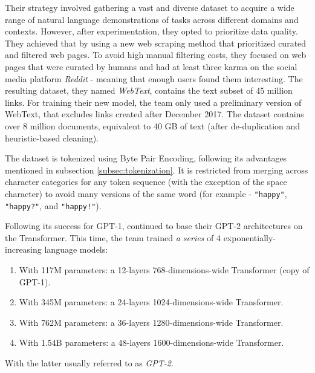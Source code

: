 \documentclass{article}
\begin{document}
\medskip
\noindent
Their strategy involved gathering a vast and diverse dataset to acquire a wide range of natural language demonstrations of tasks across different domains and contexts. However, after experimentation, they opted to prioritize data quality. They achieved that by using a new web scraping method that prioritized curated and filtered web pages. To avoid high manual filtering costs, they focused on web pages that were curated by humans and had at least three karma on the social media platform \emph{Reddit} - meaning that enough users found them interesting. The resulting dataset, they named \emph{WebText}, contains the text subset of 45 million links. For training their new model, the team only used a preliminary version of WebText, that excludes links created after December 2017. The dataset contains over 8 million documents, equivalent to 40 GB of text (after de-duplication and heuristic-based cleaning).

\medskip
\noindent
The dataset is tokenized using Byte Pair Encoding, following its advantages mentioned in subsection \ref{subsec:tokenization}. It is restricted from merging across character categories for any token sequence (with the exception of the space character) to avoid many versions of the same word (for example - \texttt{"happy"}, \texttt{"happy?"}, and \texttt{"happy!"}).

\medskip
\noindent
Following its success for GPT-1, \citet{radford2019gpt2} continued to base their GPT-2 architectures on the Transformer. This time, the team trained \emph{a series} of 4 exponentially-increasing language models:
\begin{enumerate}
    \item
        With 117M parameters: a 12-layers 768-dimensions-wide Transformer (copy of GPT-1).
    \item
        With 345M parameters: a 24-layers 1024-dimensions-wide Transformer.
    \item
        With 762M parameters: a 36-layers 1280-dimensions-wide Transformer.
    \item
        With 1.54B parameters: a 48-layers 1600-dimensions-wide Transformer.
\end{enumerate}
With the latter usually referred to as \emph{GPT-2}.
\end{document}
